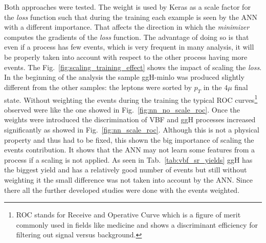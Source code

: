 Both approaches were tested. The weight is used by Keras as a scale factor for the \textit{loss} function such that during the training each example is seen by the ANN with a different importance. That affects the direction in which the \textit{minimizer} computes the gradients of the \textit{loss} function. The advantage of doing so is that even if a process has few events, which is very frequent in many analysis, it will be properly taken into account with respect to the other process having more events. The Fig.~\ref{fig:scaling_training_effect} shows the impact of scaling the \textit{loss}. In the beginning of the analysis the sample ggH-minlo was produced slightly different from the other samples: the leptons were sorted by $p_{T}$ in the $4\mu$ final state. Without weighting the events during the training the typical ROC curves\footnote{ROC stands for Receive and Operative Curve which is a figure of merit commonly used in fields like medicine and shows a discriminant efficiency for filtering out signal versus background.} observed were like the one showed in Fig.~\ref{fig:nn_no_scale_roc}. Once the weights were introduced the discrimination of VBF and ggH processes increased significantly as showed in Fig.~\ref{fig:nn_scale_roc}. Although this is not a physical property and thus had to be fixed, this shown the big importance of scaling the events contribution. It shows that the ANN may not learn some features from a process if a scaling is not applied. As seen in Tab.~\ref{tab:vbf_sr_yields} ggH has the biggest yield and has a relatively good number of events but still without weighting it the small difference was not taken into account by the ANN. Since there all the further developed studies were done with the events weighted.

